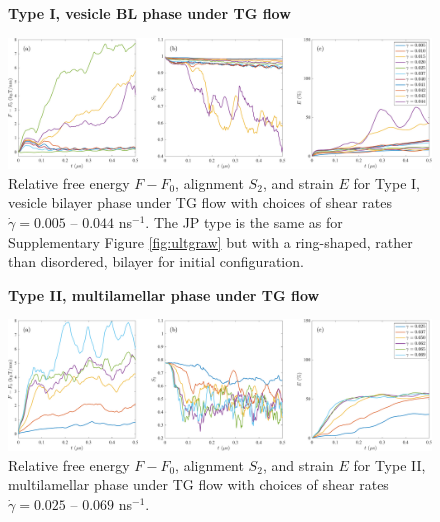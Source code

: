 \begin{figure}[h!]
\begin{center}
\textbf{Type I, vesicle BL phase under TG flow}\par\medskip
\includegraphics[width=\textwidth]{SMFigures/VeTGRaw.pdf}
\end{center}
\caption{
Relative free energy $F - F_0$,
alignment $S_2$, and strain $E$ for
Type I, vesicle bilayer phase under TG flow with choices of shear rates $\dot\gamma=0.005$ -- $0.044$ ns$^{-1}$.
The JP type is the same as for Supplementary Figure \ref{fig:ultgraw} but with a
ring-shaped, rather than disordered, bilayer for initial configuration.  
}
\label{fig:vetgraw}
\end{figure}




\begin{figure}[h!]
\begin{center}
\textbf{Type II, multilamellar phase under TG flow}\par\medskip
\includegraphics[width=\textwidth]{SMFigures/MLTGRaw.pdf}
\end{center}
\caption{
Relative free energy $F - F_0$,
alignment $S_2$, and strain $E$ for
Type II, multilamellar phase under TG flow with choices of shear rates $\dot\gamma=0.025$ -- $0.069$ ns$^{-1}$.
}
\label{fig:mltgraw}
\end{figure}


